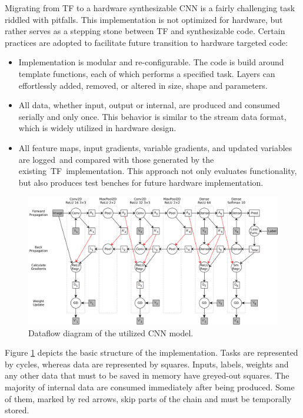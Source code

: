Migrating from TF to a hardware synthesizable CNN is a fairly challenging task riddled with pitfalls. This implementation is not optimized for hardware, but rather serves as a stepping stone between TF and synthesizable code. Certain practices are adopted to facilitate future transition to hardware targeted code:

\begin{itemize}[leftmargin=*]
    \item Implementation is modular and re-configurable. The code is build around template functions, each of which performs a specified task. Layers can effortlessly added, removed, or altered in size, shape and parameters.
    \item All data, whether input, output or internal, are produced and consumed serially and only once. This behavior is similar to the stream data format, which is widely utilized in hardware design.
    \item All feature maps, input gradients, variable gradients, and updated variables are logged and compared with those generated by the existing TF implementation. This approach not only evaluates functionality, but also produces test benches for future hardware implementation.
\end{itemize}

\begin{figure}[H]
    \centering
        \includegraphics[width=1\textwidth]{Images/block_diagrams/dataflow_cnn_model.png}
        \decoRule
        \caption[CNN dataflow]{Dataflow diagram of the utilized CNN model.}
        \label{fig: CNN dataflow}
\end{figure}

Figure \ref{fig: CNN dataflow} depicts the basic structure of the implementation. Tasks are represented by cycles, whereas data are represented by squares. Inputs, labels, weights and any other data that must to be saved in memory have greyed-out squares. The majority of internal data are consumed immediately after being produced. Some of them, marked by red arrows, skip parts of the chain and must be temporally stored.

